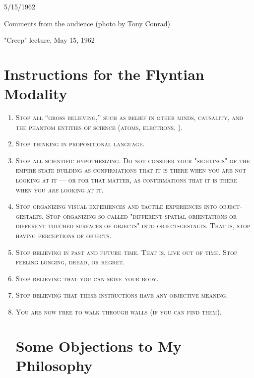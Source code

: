 \documentclass[10pt,twoside]{memoir}
\begin{document}
\clearpage

{
5/15/1962 


Comments from the audience 
(photo by Tony Conrad) 


"Creep" lecture, May 15, 1962 
}

\clearpage


\chapter{Instructions for the Flyntian Modality}

\begin{enumerate}

\item \textsc{ Stop all \enquote{gross believing,} such as belief in other minds, causality, and the phantom entities of science (atoms, electrons, \etc).}

\item \textsc{Stop thinking in propositional language.}

\item \textsc{Stop all scientific hypothesizing. Do not consider your "sightings" of the empire state building as confirmations that it is there when you are not looking at it --- or for that matter, as confirmations that it is there when you \emph{are} looking at it.}

\item \textsc{Stop organizing visual experiences and tactile experiences into object-gestalts. Stop organizing so-called "different spatial orientations or different touched surfaces of objects" into object-gestalts. That is, stop having perceptions of objects.}

\item \textsc{Stop believing in past and future time. That is, live out of time. Stop feeling longing, dread, or regret.}

\item \textsc{Stop believing that you can move your body.}

\item \textsc{Stop believing that these instructions have any objective meaning.}

\item \textsc{You are now free to walk through walls (if you can find them).}

\chapter{Some Objections to My Philosophy}



\end{enumerate}
\end{document}
